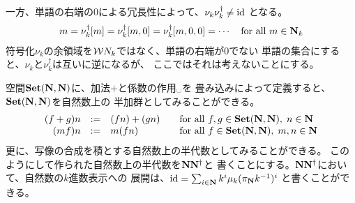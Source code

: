 	一方、単語の右端の$0$による冗長性によって、$\nu_k\nu_k^\dag\neq{\ensuremath{\operatorname{id}}}$
	となる。
	\begin{equation*}\begin{split}
		m = \nu_k^\dag[m] = \nu_k^\dag[m,0] = \nu_k^\dag[m,0,0] = \cdots
		\quad\text{for all }m\in\mathbf{N}_k
	\end{split}\end{equation*}
	符号化$\nu_k$の余領域を${{\mathcal{W}}} N_k$ではなく、単語の右端が$0$でない
	単語の集合にすると、$\nu_k$と$\nu_k^\dag$は互いに逆になるが、
	ここではそれは考えないことにする。

	\begin{note}[写像の空間でのk進数表示]\label{note:写像の空間でのk進数表示} %
		空間${\mathbf{Set}}(\mathbf{N},\mathbf{N})$に、加法$+$と係数の作用$\myspace$を
		畳み込みによって定義すると、${\mathbf{Set}}(\mathbf{N},\mathbf{N})$を自然数上の
		半加群としてみることができる。
		{\setlength\arraycolsep{2pt}\begin{equation*}\begin{array}{rcll}
			(f + g)n &:=& (fn) + (gn)
			&\quad\text{for all }f,g\in{\ensuremath{\mathbf{Set}}}(\mathbf{N},\mathbf{N}),\;n\in\mathbf{N} \\
			(mf)n &:=& m(fn)
			&\quad\text{for all }f\in{\ensuremath{\mathbf{Set}}}(\mathbf{N},\mathbf{N}),\;m,n\in\mathbf{N} \\
		\end{array}\end{equation*}}
		更に、写像の合成を積とする自然数上の半代数としてみることができる。
		このようにして作られた自然数上の半代数を$\mathbf{N}\mathbf{N}^\dag$と
		書くことにする。$\mathbf{N}\mathbf{N}^\dag$において、自然数の$k$進数表示への
		展開は、${\operatorname{id}} = \sum_{i\in\mathbf{N}}k^i\mu_k(\pi_{\mathbf{N}} k^{-1})^i$
		と書くことができる。
	\end{note} %

